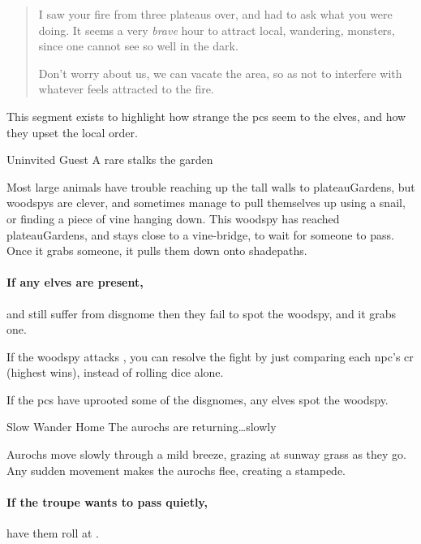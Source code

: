 \begin{quotation}
  I saw your fire from three plateaus over, and had to ask what you were doing.
  It seems a very \emph{brave} hour to attract local, wandering,
  \glspl{monster}, since one cannot see so well in the dark.

  Don't worry about us, we can vacate the area, so as not to interfere with
  whatever feels attracted to the fire.
\end{quotation}

This \gls{segment} exists to highlight how strange the \glspl{pc} seem to the
elves, and how they upset the local order.

{Uninvited Guest}%
{A rare  stalks the garden}%

\label{plateauWaterIngredient}
Most large animals have trouble reaching up the tall walls to \gls{plateauGardens}, but \glspl{woodspy} are clever, and sometimes manage to pull themselves up using a snail, or finding a piece of vine hanging down.
This \gls{woodspy} has reached \gls{plateauGardens}, and stays close to a vine-bridge, to wait for someone to pass.
Once it grabs someone, it pulls them down onto \gls{shadepaths}.

\paragraph{If any elves are present,}
and still suffer from \gls{disgnome} then
they fail to spot the \gls{woodspy}, and it grabs one.

If the \gls{woodspy} attacks , you can resolve the fight by just
comparing each \gls{npc}'s \gls{cr} (highest wins), instead of rolling dice
alone.%

\woodspy

If the \glspl{pc} have uprooted some of the \glspl{disgnome}, any elves spot the \gls{woodspy}.

{Slow Wander Home}%
{The aurochs are returning\ldots slowly}%

Aurochs move slowly through a mild breeze, grazing at \gls{sunway} grass as they go.
Any sudden movement makes the aurochs flee, creating a stampede.

\paragraph{If the troupe wants to pass quietly,}
have them roll  at \tn[8].

